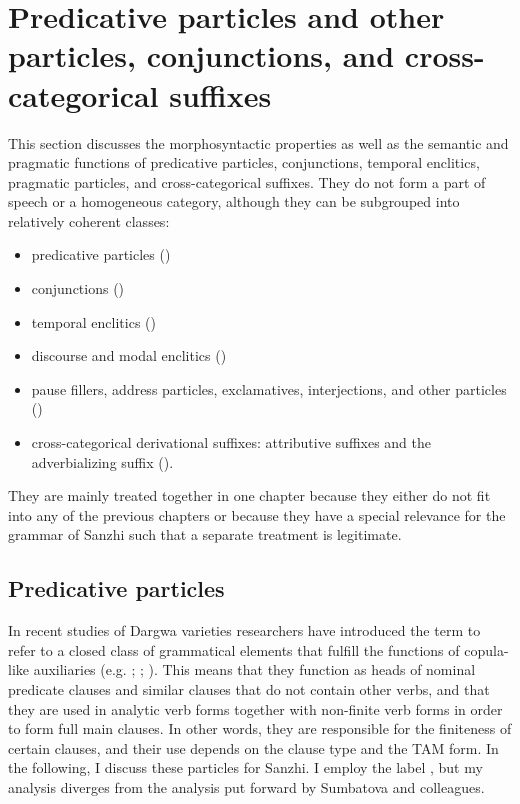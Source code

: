 \chapter[Particles, conjunctions, and cross-categorical suffixes]{Predicative particles and other particles, conjunctions, and cross-categorical suffixes}
\label{cpt:Minor parts of speech}

This section discusses the morphosyntactic properties as well as the semantic and pragmatic functions of predicative particles, conjunctions, temporal enclitics, pragmatic particles, and cross-categorical suffixes. They do not form a part of speech or a homogeneous category, although they can be subgrouped into relatively coherent classes:
%
\begin{itemize}
	\item	predicative particles ()
	\item	conjunctions ()
	\item  temporal enclitics ()
	\item	discourse and modal enclitics ()
	\item	pause fillers, address particles, exclamatives, interjections, and other particles ()
	\item	cross-categorical derivational suffixes: attributive suffixes and the adverbializing suffix ().
\end{itemize}

They are mainly treated together in one chapter because they either do not fit into any of the previous chapters or because they have a special relevance for the grammar of Sanzhi such that a separate treatment is legitimate.

\section{Predicative particles}
\label{sec:Predicative particles}

In recent studies of Dargwa varieties researchers have introduced the term  to refer to a closed class of grammatical elements that fulfill the functions of copula-like auxiliaries (e.g. ; ; ). This means that they function as heads of nominal predicate clauses and similar clauses that do not contain other verbs, and that they are used in analytic verb forms together with non-finite verb forms in order to form full main clauses. In other words, they are responsible for the finiteness of certain clauses, and their use depends on the clause type and the TAM form. In the following, I discuss these particles for Sanzhi. I employ the label , but my analysis diverges from the analysis put forward by Sumbatova and colleagues.

